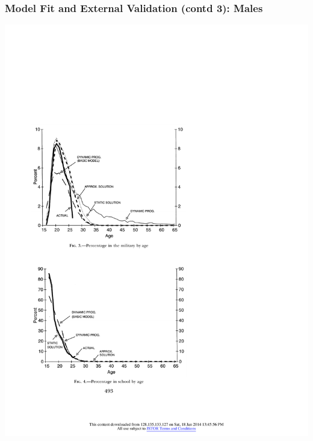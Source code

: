 \begin{frame}
	\frametitle{Model Fit and External Validation (contd 3): Males}
	\begin{center}
	\includegraphics[width=.9\textwidth]{tab-figs/figure3_1997}
	\end{center}
\end{frame}

